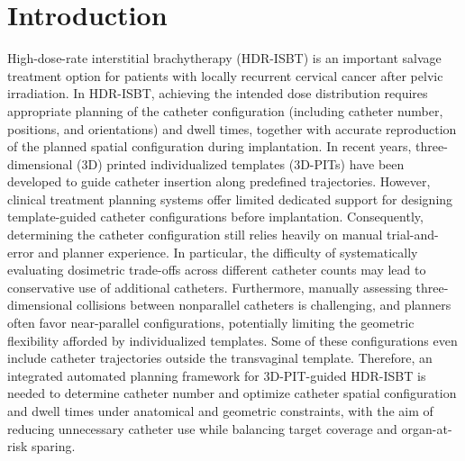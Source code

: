 \documentclass[12pt,twoside,letterpaper]{article}
\begin{document}
\section{Introduction}\label{sec:1}

High-dose-rate interstitial brachytherapy (HDR-ISBT) is an important salvage treatment option for patients with locally recurrent cervical cancer after pelvic irradiation.\cite{ref1,ref2,ref3,ref4} In HDR-ISBT, achieving the intended dose distribution requires appropriate planning of the catheter configuration (including catheter number, positions, and orientations) and dwell times, together with accurate reproduction of the planned spatial configuration during implantation.\cite{ref5,ref6,ref7,ref8,ref9,ref10,ref11,ref12,ref13} In recent years, three-dimensional (3D) printed individualized templates (3D-PITs) have been developed to guide catheter insertion along predefined trajectories.\cite{ref14,ref15,ref16,ref17,ref18,ref19,ref20,ref21,ref22,ref23,ref24} However, clinical treatment planning systems offer limited dedicated support for designing template-guided catheter configurations before implantation. Consequently, determining the catheter configuration still relies heavily on manual trial-and-error and planner experience. In particular, the difficulty of systematically evaluating dosimetric trade-offs across different catheter counts may lead to conservative use of additional catheters.\cite{ref9,ref10,ref11,ref12,ref25,ref26} Furthermore, manually assessing three-dimensional collisions between nonparallel catheters is challenging, and planners often favor near-parallel configurations, potentially limiting the geometric flexibility afforded by individualized templates. Some of these configurations even include catheter trajectories outside the transvaginal template.\cite{ref25} Therefore, an integrated automated planning framework for 3D-PIT-guided HDR-ISBT is needed to determine catheter number and optimize catheter spatial configuration and dwell times under anatomical and geometric constraints, with the aim of reducing unnecessary catheter use while balancing target coverage and organ-at-risk sparing.
\end{document}
